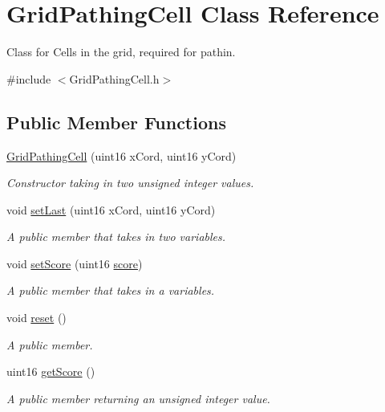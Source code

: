 \hypertarget{class_grid_pathing_cell}{}\section{Grid\+Pathing\+Cell Class Reference}
\label{class_grid_pathing_cell}


Class for Cells in the grid, required for pathin.  




{\ttfamily \#include $<$Grid\+Pathing\+Cell.\+h$>$}

\subsection*{Public Member Functions}
\begin{DoxyCompactItemize}
\item 
\hyperlink{class_grid_pathing_cell_acbe865cb1e21ae9e22fda91a6eac7a57}{Grid\+Pathing\+Cell} (uint16 x\+Cord, uint16 y\+Cord)
\begin{DoxyCompactList}\small\item\em Constructor taking in two unsigned integer values. \end{DoxyCompactList}\item 
void \hyperlink{class_grid_pathing_cell_a6d360533681a9fc827b0b01c12f9fbf1}{set\+Last} (uint16 x\+Cord, uint16 y\+Cord)
\begin{DoxyCompactList}\small\item\em A public member that takes in two variables. \end{DoxyCompactList}\item 
void \hyperlink{class_grid_pathing_cell_a7e0b53ba48d7aa0576147759836b933a}{set\+Score} (uint16 \hyperlink{class_grid_pathing_cell_ab4d6783c766e718c20b173a89fe8e74d}{score})
\begin{DoxyCompactList}\small\item\em A public member that takes in a variables. \end{DoxyCompactList}\item 
void \hyperlink{class_grid_pathing_cell_ae706bf7d75f31d2a00d5e6de28da635c}{reset} ()
\begin{DoxyCompactList}\small\item\em A public member. \end{DoxyCompactList}\item 
uint16 \hyperlink{class_grid_pathing_cell_afa21d615e383d1f01664590903d71f8f}{get\+Score} ()
\begin{DoxyCompactList}\small\item\em A public member returning an unsigned integer value. \end{DoxyCompactList}\item 

\end{DoxyCompactItemize}
